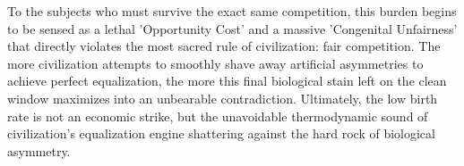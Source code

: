 To the subjects who must survive the exact same competition, this burden begins to be sensed as a lethal 'Opportunity Cost' and a massive 'Congenital Unfairness' that directly violates the most sacred rule of civilization: fair competition. The more civilization attempts to smoothly shave away artificial asymmetries to achieve perfect equalization, the more this final biological stain left on the clean window maximizes into an unbearable contradiction. Ultimately, the low birth rate is not an economic strike, but the unavoidable thermodynamic sound of civilization's equalization engine shattering against the hard rock of biological asymmetry.
